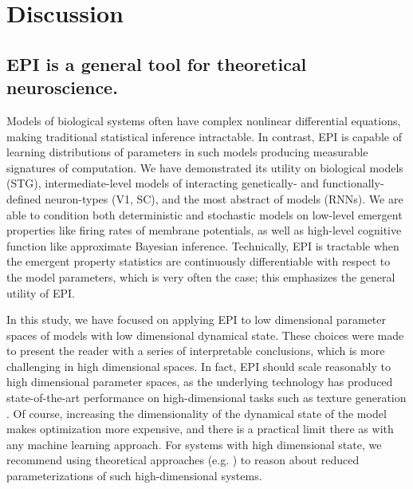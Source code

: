 \documentclass[11pt]{article}
\begin{document}
\section{Discussion}
\subsection{EPI is a general tool for theoretical neuroscience.} 
Models of biological systems often have complex nonlinear differential equations, making traditional statistical inference intractable. 
In contrast, EPI is capable of learning distributions of parameters in such models producing measurable signatures of computation.
We have demonstrated its utility on biological models (STG), intermediate-level models of interacting genetically- and functionally-defined neuron-types (V1, SC), and the most abstract of models (RNNs).  
We are able to condition both deterministic and stochastic models on low-level emergent properties like firing rates of membrane potentials, as well as high-level cognitive function like approximate Bayesian inference.  
Technically, EPI is tractable when the emergent property statistics are continuously differentiable with respect to the model parameters, which is very often the case; this emphasizes the general utility of EPI.

In this study, we have focused on applying EPI to low dimensional parameter spaces of models with low dimensional dynamical state.
These choices were made to present the reader with a series of  interpretable conclusions, which is more challenging in high dimensional spaces.
In fact, EPI should scale reasonably to high dimensional parameter spaces, as the underlying technology has produced state-of-the-art performance on high-dimensional tasks such as texture generation \cite{loaiza2017maximum}.
Of course, increasing the dimensionality of the dynamical state of the model makes optimization more expensive, and there is a practical limit there as with any machine learning approach.
For systems with high dimensional state, we recommend using theoretical approaches (e.g. \cite{mastrogiuseppe2018linking}) to reason about reduced parameterizations of such high-dimensional systems.
\end{document}
